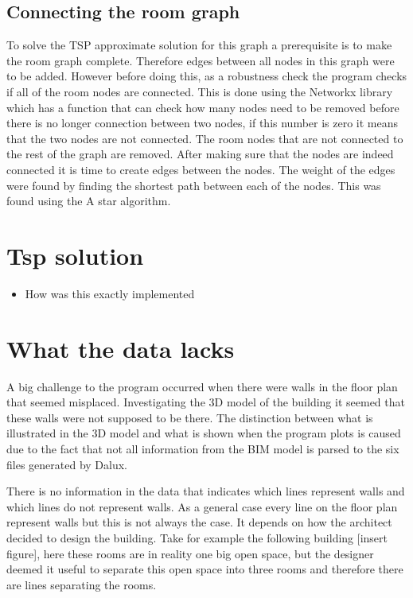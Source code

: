 \subsection{Connecting the room graph}
To solve the TSP approximate solution for this graph a prerequisite is to make the room graph complete. Therefore edges between all nodes in this graph were to be added.
However before doing this, as a robustness check the program checks if all of the room nodes are connected. This is done using the Networkx library which has a function that can check how many nodes need to be removed before there is no longer connection between two nodes, if this number is zero it means that the two nodes are not connected. The room nodes that are not connected to the rest of the graph are removed.
After making sure that the nodes are indeed connected it is time to create edges between the nodes. The weight of the edges were found by finding the shortest path between each of the nodes. This was found using the A star algorithm. 


\section{Tsp solution}

\begin{itemize}
    \item How was this exactly implemented
\end{itemize}




\section{What the data lacks}
A big challenge to the program occurred when there were walls in the floor plan that seemed misplaced. Investigating the 3D model of the building it seemed that these walls were not supposed to be there. The distinction between what is illustrated in the 3D model and what is shown when the program plots is caused due to the fact that not all information from the BIM model is parsed to the six files generated by Dalux. 

There is no information in the data that indicates which lines represent walls and which lines do not represent walls. As a general case every line on the floor plan represent walls but this is not always the case. It depends on how the architect decided to design the building. Take for example the following building [insert figure], here these rooms are in reality one big open space, but the designer deemed it useful to separate this open space into three rooms and therefore there are lines separating the rooms. 

